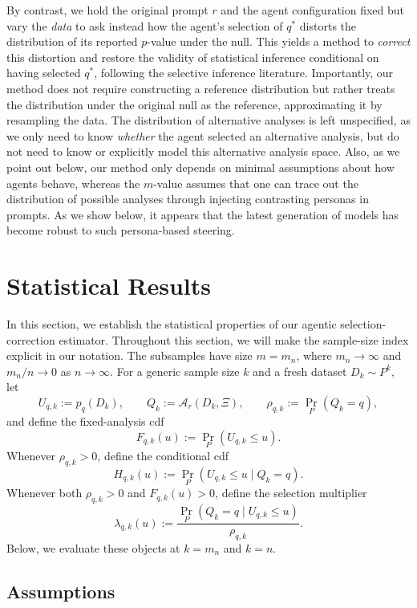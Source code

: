 \documentclass[10pt]{article}
\begin{document}
By contrast, we hold the original prompt $r$ and the agent configuration fixed but vary the \textit{data} to ask instead how the agent's selection of $q^*$ distorts the distribution of its reported $p$-value under the null. This yields a method to \textit{correct} this distortion and restore the validity of statistical inference conditional on having selected $q^*$, following the selective inference literature. Importantly, our method does not require constructing a reference distribution but rather treats the distribution under the original null as the reference, approximating it by resampling the data. The distribution of alternative analyses is left unspecified, as we only need to know \textit{whether} the agent selected an alternative analysis, but do not need to know or explicitly model this alternative analysis space. Also, as we point out below, our method only depends on minimal assumptions about how agents behave, whereas the $m$-value assumes that one can trace out the distribution of possible analyses through injecting contrasting personas in prompts. As we show below, it appears that the latest generation of models has become robust to such persona-based steering.

\section{Statistical Results} \label{sec:statistical_results}
In this section, we establish the statistical properties of our agentic selection-correction estimator.
Throughout this section, we will make the sample-size index explicit in our notation. The subsamples have size $m=m_n$, where $m_n\rightarrow \infty$ and $m_n/n\rightarrow 0$ as $n\rightarrow \infty$.  For a generic sample size $k$ and a fresh dataset $D_k\sim P^k$, let
\[
U_{q,k}:=p_q(D_k),\qquad
Q_k:=\mathcal A_r(D_k,\Xi),\qquad
\rho_{q,k}:=\Pr_P(Q_k=q),
\]
and define the fixed-analysis cdf
\[
F_{q,k}(u):=\Pr_P(U_{q,k}\le u).
\]
Whenever $\rho_{q,k}>0$, define the conditional cdf
\[
H_{q,k}(u)
:=
\Pr_P(U_{q,k}\le u\mid Q_k=q).
\]
Whenever both $\rho_{q,k}>0$ and $F_{q,k}(u)>0$, define the selection multiplier
\begin{equation}
\label{eq:lambda_k}
\lambda_{q,k}(u)
:=
\frac{\Pr_P(Q_k=q\mid U_{q,k}\le u)}
     {\rho_{q,k}}.
\end{equation}
Below, we evaluate these objects at $k=m_n$ and $k=n$.

\subsection{Assumptions}
\end{document}

